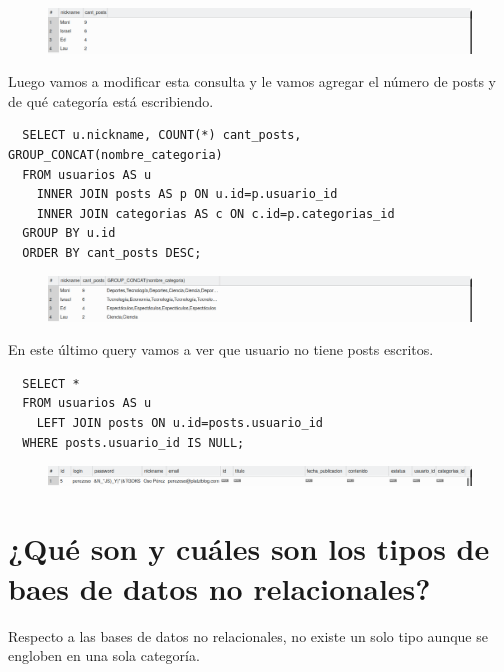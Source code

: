 \documentclass{article}
\begin{document}
\newpage

\begin{figure}[h!]
  \centering
  \includegraphics[scale=0.5]{./Pictures/140_sixth_question.png}
\end{figure}


Luego vamos a modificar esta consulta y le vamos agregar el número de posts y
de qué categoría está escribiendo.\\

\begin{verbatim}
  SELECT u.nickname, COUNT(*) cant_posts, GROUP_CONCAT(nombre_categoria)
  FROM usuarios AS u
    INNER JOIN posts AS p ON u.id=p.usuario_id
    INNER JOIN categorias AS c ON c.id=p.categorias_id
  GROUP BY u.id
  ORDER BY cant_posts DESC;
\end{verbatim}

\begin{figure}[h!]
  \centering
  \includegraphics[scale=0.5]{./Pictures/141_seventh_question.png}
\end{figure}

En este último query vamos a ver que usuario no tiene posts escritos.\\

\begin{verbatim}
  SELECT *
  FROM usuarios AS u
    LEFT JOIN posts ON u.id=posts.usuario_id
  WHERE posts.usuario_id IS NULL;
\end{verbatim}

\begin{figure}[h!]
  \centering
  \includegraphics[scale=0.5]{./Pictures/142_eighth_question.png}
\end{figure}

\newpage

\section{¿Qué son y cuáles son los tipos de baes de datos no relacionales?}%
Respecto a las bases de datos no relacionales, no existe un solo tipo aunque se
engloben en una sola categoría.
\end{document}
